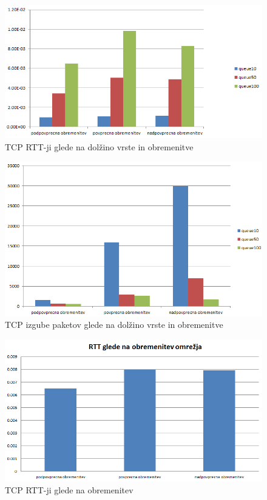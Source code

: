 \documentclass[11pt, a4paper, slovene]{book}
\begin{document}
\begin{figure}[h]
	\centering
	\includegraphics[width=\textwidth]{TCP_RTT_VRSTA_OBREMENITEV.png}
	\caption{TCP RTT-ji glede na dolžino vrste in obremenitve}
	\label{2}	
\end{figure}

\begin{figure}[h]
	\centering
	\includegraphics[width=\textwidth]{IZGUBE_PAKETOV_VRSTA_OBREMENITEV.png}
	\caption{TCP izgube paketov glede na dolžino vrste in obremenitve}
	\label{6}	
\end{figure}

\begin{figure}[h]
	\centering
	\includegraphics[width=\textwidth]{TCP_RTT_obremenitev_omrezja.png}
	\caption{TCP RTT-ji glede na obremenitev}
	\label{3}	
\end{figure}
\end{document}
